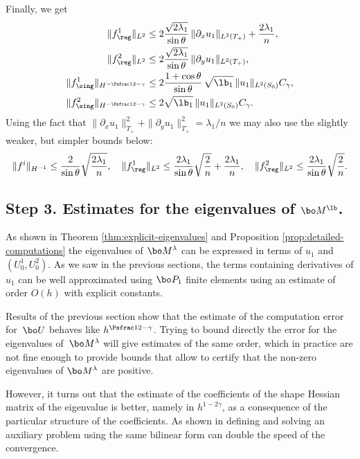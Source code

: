 Finally, we get
\begin{align*}
\|f^1_{\reg}\|_{L^2} &\leq 2\frac{\sqrt{2\lambda_1}}{\sin \theta}\, \|\partial_x u_1\|_{L^2(T_+)}+\frac{2\lambda_1}{n},\\
\|f^2_{\reg}\|_{L^2} &\leq 2\frac{\sqrt{2\lambda_1}}{\sin \theta}\,\|\partial_y u_1\|_{L^2(T_+)},\\
\|f^1_{\sing}\|_{H^{-\Psfrac 12-\gamma}} &\le 2 \frac{1+ \cos \theta}{ \sin \theta}\, \sqrt{ \lb_1 }\, \|u_1\|_{L^2(S_0)}C_\gamma,\\
\|f^2_{\sing}\|_{H^{-\Psfrac 12-\gamma}} &\le 2 \sqrt{ \lb_1 }\, \|u_1 \|_{L^2(S_0)}C_\gamma.
\end{align*}
Using the fact that $\|\partial_x u_1\|_{T_+}^2+ \|\partial_y u_1\|_{T_+}^2 = \lambda_1/n$ we may also use the slightly weaker, but simpler bounds below:
\[
\|f^i\|_{H^{-1}} \leq \frac{2 }{\sin\theta } \sqrt{\frac{2\lambda_1}{n}},\quad
\|f^1_{\reg}\|_{L^2} \leq \frac{2\lambda_1}{\sin \theta}\sqrt{\frac{2}{n}}+\frac{2\lambda_1}{n},\quad
\|f^2_{\reg}\|_{L^2} \leq \frac{2\lambda_1}{\sin \theta}\sqrt{\frac{2}{n}}.
\]

\subsection{Step 3. Estimates for the eigenvalues of $\bo M^\lb$.}
\label{sec:estimates-coeffs}
As shown in Theorem \ref{thm:explicit-eigenvalues} and Proposition \ref{prop:detailed-computations} the eigenvalues of $\bo M^\lambda$ can be expressed in terms of $u_1$ and $(U_0^1,U_0^2)$. As we saw in the previous sections, the terms containing derivatives of $u_1$ can be well approximated using $\bo P_1$ finite elements using an estimate of order $O(h)$ with explicit constants.

Results of the previous section show that the estimate of the computation error for~$\bo U$ behaves like $h^{\Psfrac 12 -\gamma}$. Trying to bound directly the error for the eigenvalues of~$\bo M^\lambda$ will give estimates of the same order, which in practice are not fine enough to provide bounds that allow to certify that the non-zero eigenvalues of $\bo M^\lambda$ are positive.

However, it turns out that the estimate of the coefficients of the shape Hessian matrix of the eigenvalue is better, namely in $h^{1-2\gamma}$, as a consequence of the particular structure of the coefficients. As shown in \cite[\S 5]{approximation-trick} defining and solving an auxiliary problem using the same bilinear form can double the speed of the convergence.


